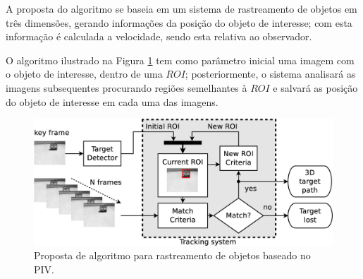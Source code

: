 A proposta do algoritmo se baseia em um sistema de rastreamento de objetos 
em três dimensões, gerando informações
da posição do objeto de interesse; com esta informação é calculada a velocidade,
sendo esta relativa ao observador.

O algoritmo ilustrado na Figura \ref{fig:system} tem como parâmetro inicial uma imagem com o
objeto de interesse, dentro de uma $ROI$; posteriormente, 
o sistema analisará as imagens subsequentes procurando regiões semelhantes à $ROI$
e salvará as posição do objeto de interesse em cada uma das imagens.

\begin{figure}[h]
\includegraphics[width=\columnwidth]{images/figure1-diagram1.eps}
\caption{Proposta de algoritmo para rastreamento de objetos baseado no PIV.}
\label{fig:system}
\end{figure}

